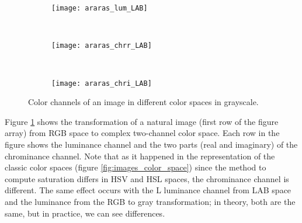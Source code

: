 \begin{figure}[!ht]
    \begin{subfigure}[t]{\textwidth+20pt\relax}
    	\texttt{[image: araras\_lum\_LAB]}
    \end{subfigure}     
    ~ %
    \begin{subfigure}[b]{0.3\textwidth}
        \texttt{[image: araras\_chrr\_LAB]}
    \end{subfigure}
    ~ %
    \begin{subfigure}[b]{0.3\textwidth}
        \texttt{[image: araras\_chri\_LAB]}
    \end{subfigure} \vspace{5pt} 
        
    \caption{Color channels of an image in different color spaces in grayscale.}\label{fig:images_color_complex_space}    
\end{figure}

Figure \ref{fig:images_color_complex_space} shows the transformation of a natural image (first row of the figure array) from RGB space to complex two-channel color space. Each row in the figure shows the luminance channel and the two parts (real and imaginary) of the chrominance channel. Note that as it happened in the representation of the classic color spaces (figure \ref{fig:images_color_space}) since the method to compute saturation differs in HSV and HSL spaces, the chrominance channel is different. The same effect occurs with the L luminance channel from LAB space and the luminance from the RGB to gray transformation; in theory, both are the same, but in practice, we can see differences.


%
%
%
%
%
%


